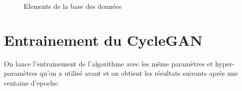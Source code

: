 \begin{figure}[H]
    \centering
    \qquad
    \caption{Elements de la base des données}%
    \label{fig:example}%
\end{figure}

\section{Entrainement du CycleGAN}
On lance l'entrainement de l'algorithme avec les même paramètres et hyper-paramètres qu'on a utilisé avant et on obtient les résultats suivants après une centaine d'epochs:

